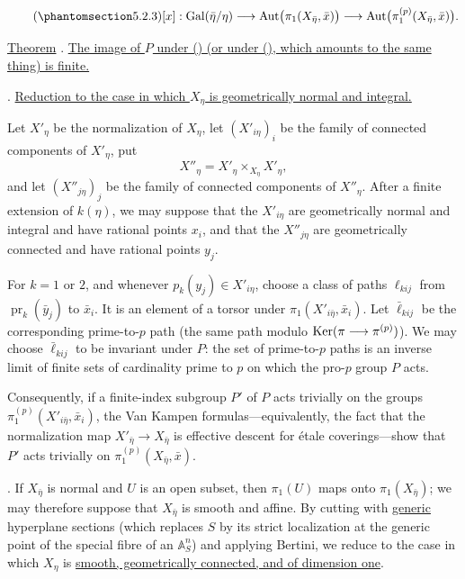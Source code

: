 \begin{equation}\tag{\SGARefTarget{sga7.sga7i.ei.n5-2-3}{5.2.3}}
[x]:\Gal(\bar\eta/\eta)
\longrightarrow\Aut\bigl(\pi_1(X_{\bar\eta},\bar x)\bigr)
\longrightarrow\Aut\bigl(\pi_1^{(p)}(X_{\bar\eta},\bar x)\bigr).
\end{equation}

\underline{Theorem} . \underline{The image of $P$ under ()
(or under (), which amounts to the same thing) is finite.}

. \underline{Reduction to the case in which $X_\eta$ is
geometrically normal and integral.}

Let $X'_\eta$ be the normalization of $X_\eta$, let
$(X'_{i\eta})_i$ be the family of connected components of $X'_\eta$,
put
\[
X''_\eta=X'_\eta\times_{X_\eta}X'_\eta,
\]
and let $(X''_{j\eta})_j$ be the family of connected components of
$X''_\eta$. After a finite extension of $k(\eta)$, we may suppose that
the $X'_{i\eta}$ are geometrically normal and integral and have rational
points $x_i$, and that the $X''_{j\eta}$ are geometrically connected and
have rational points $y_j$.

For $k=1$ or $2$, and whenever $p_k(y_j)\in X'_{i\eta}$, choose a class
of paths $\ell_{kij}$ from $\operatorname{pr}_k(\bar y_j)$ to $\bar x_i$.
It is an element of a torsor under
$\pi_1(X'_{i\bar\eta},\bar x_i)$. Let $\bar\ell_{kij}$ be the
corresponding prime-to-$p$ path (the same path modulo
$\operatorname{Ker}(\pi\longrightarrow\pi^{(p)})$). We may choose
$\bar\ell_{kij}$ to be invariant under $P$: the set of prime-to-$p$
paths is an inverse limit of finite sets of cardinality prime to $p$ on
which the pro-$p$ group $P$ acts.

Consequently, if a finite-index subgroup $P'$ of $P$ acts trivially on
the groups $\pi_1^{(p)}(X'_{i\bar\eta},\bar x_i)$, the Van Kampen
formulas---equivalently, the fact that the normalization map
$X'_{\bar\eta}\longrightarrow X_{\bar\eta}$ is effective descent for
\'{e}tale coverings---show that $P'$ acts trivially on
$\pi_1^{(p)}(X_{\bar\eta},\bar x)$.

. If $X_{\bar\eta}$ is normal and $U$ is an open subset, then
$\pi_1(U)$ maps onto $\pi_1(X_{\bar\eta})$; we may therefore suppose
that $X_{\bar\eta}$ is smooth and affine. By cutting with
\underline{generic} hyperplane sections (which replaces $S$ by its
strict localization at the generic point of the special fibre of an
$\mathbb A^n_S$) and applying Bertini, we reduce to the case in which
$X_\eta$ is \underline{smooth, geometrically connected, and of
dimension one}.

